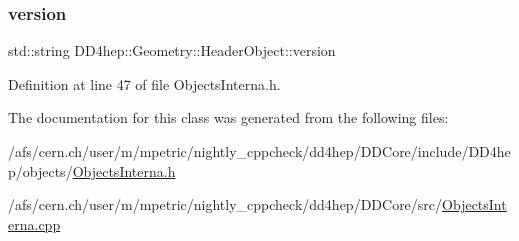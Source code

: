 \subsubsection{\texorpdfstring{version}{version}}
{\footnotesize\ttfamily std\+::string D\+D4hep\+::\+Geometry\+::\+Header\+Object\+::version}



Definition at line 47 of file Objects\+Interna.\+h.



The documentation for this class was generated from the following files\+:\begin{DoxyCompactItemize}
\item 
/afs/cern.\+ch/user/m/mpetric/nightly\+\_\+cppcheck/dd4hep/\+D\+D\+Core/include/\+D\+D4hep/objects/\hyperlink{_objects_interna_8h}{Objects\+Interna.\+h}\item 
/afs/cern.\+ch/user/m/mpetric/nightly\+\_\+cppcheck/dd4hep/\+D\+D\+Core/src/\hyperlink{_objects_interna_8cpp}{Objects\+Interna.\+cpp}\end{DoxyCompactItemize}
